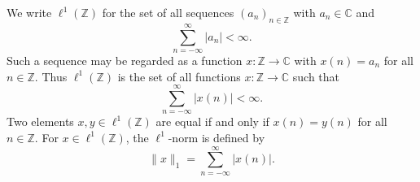 We write $\ell^1(\mathbb{Z})$ for the set of all sequences $(a_n)_{n \in \mathbb{Z}}$ with $a_n \in \mathbb{C}$ and
$$\sum_{n=-\infty}^{\infty} |a_n| < \infty.$$
Such a sequence may be regarded as a function $x: \mathbb{Z} \to \mathbb{C}$ with $x(n) = a_n$ for all $n \in \mathbb{Z}$. Thus $\ell^1(\mathbb{Z})$ is the set of all functions $x: \mathbb{Z} \to \mathbb{C}$ such that
$$\sum_{n=-\infty}^{\infty} |x(n)| < \infty.$$
Two elements $x, y \in \ell^1(\mathbb{Z})$ are equal if and only if $x(n) = y(n)$ for all $n \in \mathbb{Z}$. For $x \in \ell^1(\mathbb{Z})$, the $\ell^1$-norm is defined by
$$\|x\|_1 = \sum_{n=-\infty}^{\infty} |x(n)|.$$
